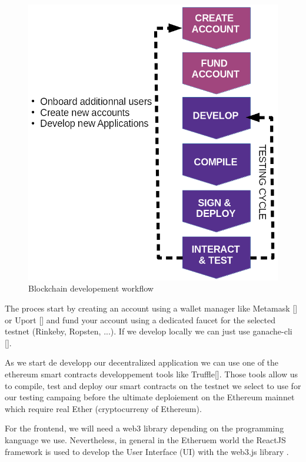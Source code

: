 \documentclass{isprs} %
\begin{document}
\begin{figure}[ht!]
\begin{center}
		\includegraphics[width=1.0\columnwidth]{figures/eth-dev-process.png}
	\caption{Blockchain developement workflow}
\label{fig:figure_placement}
\end{center}
\end{figure}
  
The proces start by creating an account using a wallet manager like Metamask [] or Uport [] and fund your account using a dedicated faucet for the selected testnet (Rinkeby, Ropsten, ...). If we develop locally we can just use ganache-cli [].

As we start de developp our decentralized application we can use one of the ethereum smart contracts developpement tools like Truffle[]. Those tools allow us to compile, test and deploy our smart contracts on the testnet we select to use for our testing campaing before the ultimate deploiement on the Ethereum mainnet which require real Ether (cryptocurreny of Ethereum).

For the frontend, we will need a web3 library depending on the programming kanguage we use. Nevertheless, in general in the Etheruem world the ReactJS framework is used to develop the User Interface (UI) with the web3.js library .
\end{document}
